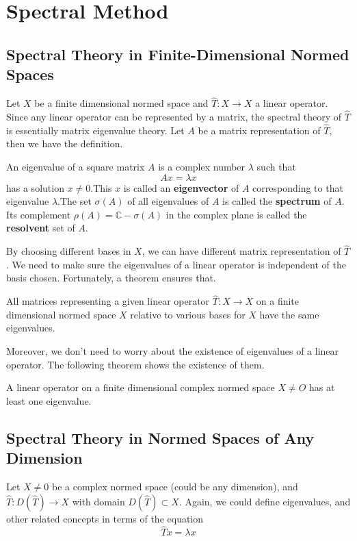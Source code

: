 \chapter{Spectral Method} \label{chap:spectral-method}
\section{Spectral Theory in Finite-Dimensional Normed Spaces}
Let $X$ be a finite dimensional normed space and $\hat{T}: X \to X$ a linear operator. Since any linear operator can be represented by a matrix, the spectral theory of $\hat{T}$ is essentially matrix eigenvalue theory. \cite{kreyszig_introductory_1978} Let $A$ be a matrix representation of $\hat{T}$, then we have the definition.

\begin{definition}
	An eigenvalue of a square matrix $A$ is a complex number $\lambda$ such that
	\[ Ax = \lambda x \]
	has a solution $x\neq 0$.This $x$ is called an \textbf{eigenvector} of $A$ corresponding to that eigenvalue $\lambda$.The set $\sigma(A)$ of all eigenvalues of $A$ is called the \textbf{spectrum} of $A$. Its complement $\rho(A) = \mathbb{C}-\sigma(A)$ in the complex plane is called the \textbf{resolvent} set of $A$.
\end{definition}

By choosing different bases in $X$, we can have different matrix representation of $\hat{T}$. We need to make sure the eigenvalues of a linear operator is independent of the basis chosen. Fortunately, a theorem ensures that.

\begin{theorem}
	All matrices representing a given linear operator $\hat{T}: X \to X$ on a finite dimensional normed space $X$ relative to various bases for $X$ have the same eigenvalues.
\end{theorem}


Moreover, we don't need to worry about the existence of eigenvalues of a linear operator. The following theorem shows the existence of them.
\begin{theorem}
	A linear operator on a finite dimensional complex normed space $X\neq{O}$ has at least one eigenvalue.
\end{theorem}


\section{Spectral Theory in Normed Spaces of Any Dimension}
Let $X\neq {0}$ be a complex normed space (could be any dimension), and $\hat{T}: D(\hat{T}) \to X$ with domain $D(\hat{T}) \subset X$. Again, we could define eigenvalues, and other related concepts in terms of the equation
\[ \hat{T}x = \lambda x \]

